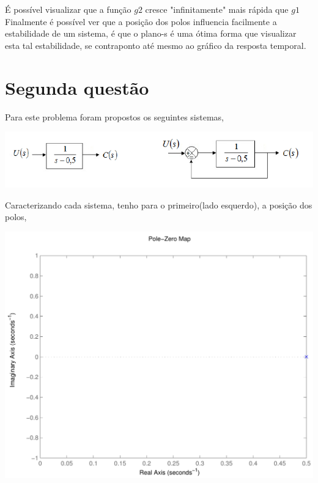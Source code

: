 \documentclass[paper=a4, fontsize=11pt]{article}
\begin{document}
É possível visualizar que a função $g2$ cresce "infinitamente" mais rápida que $g1$
Finalmente é possível ver que a posição dos polos influencia facilmente a 
estabilidade de um sistema, é que o plano-s é uma ótima forma que visualizar
esta tal estabilidade, se contraponto até mesmo ao gráfico da resposta temporal.


\section{Segunda questão}

Para este problema foram propostos os seguintes sistemas,

\begin{center}
    \includegraphics[scale=.5]{s2q.png}
\end{center}

Caracterizando cada sistema, tenho para o primeiro(lado esquerdo), a posição 
dos polos,

\begin{center}
    \includegraphics[scale=.5]{pz2qs1.pdf}
\end{center}
\end{document}
